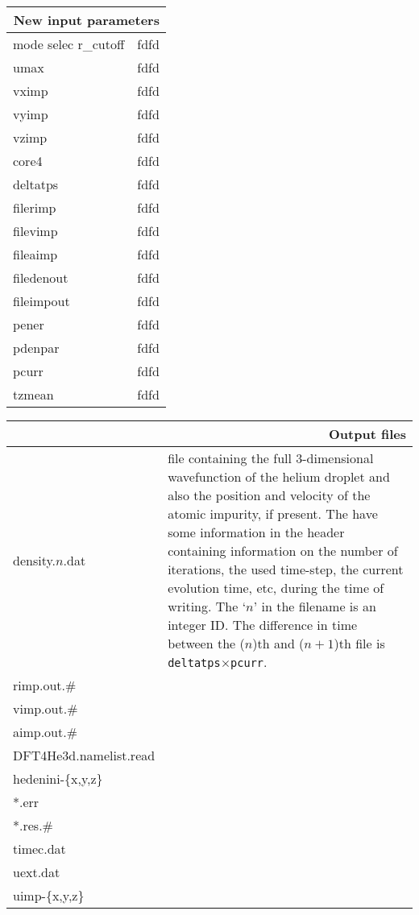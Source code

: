 \documentclass[10pt,a4paper]{article}
\begin{document}
	\begin{center}
		\begin{tabular}{l|p{8.0cm}}
			\multicolumn{2}{r}{\textbf{New input parameters}} \\
			\hline\hline	
			mode
			selec
			r\_cutoff	& fdfd \\
			umax	& fdfd \\
			vximp	& fdfd \\
			vyimp	& fdfd \\
			vzimp	& fdfd \\
			core4	& fdfd \\
			deltatps	& fdfd \\
			filerimp	& fdfd \\
			filevimp	& fdfd \\
			fileaimp	& fdfd \\
			filedenout	& fdfd \\
			fileimpout	& fdfd \\
			pener	& fdfd \\
			pdenpar	& fdfd \\
			pcurr	& fdfd \\
			tzmean	& fdfd \\
		\end{tabular}
	\end{center}

	\begin{center}
	\begin{tabular}{l|p{7.5cm}}
		\multicolumn{2}{r}{\textbf{Output files}} \\
		\hline\hline
			density.$n$.dat	& file containing the full 3-dimensional wavefunction of the helium droplet and also the position and velocity of the atomic impurity, if present. The have some information in the header containing information on the number of iterations, the used time-step, the current evolution time, etc, during the time of writing. The `$n$' in the filename is an integer ID. The difference in time between the ($n$)th and ($n+1$)th file is \verb| deltatps|$\times$\verb|pcurr|. \\
			rimp.out.\#	& \\
			vimp.out.\#	& \\
			aimp.out.\#	& \\
			DFT4He3d.namelist.read	& \\
			hedenini-\{x,y,z\}	& \\
			*.err	&	\\
			*.res.\#	&	\\
			timec.dat	& \\
			uext.dat	&	\\
			uimp-\{x,y,z\}	& \\		
	\end{tabular}
\end{center}
	
\end{document}
